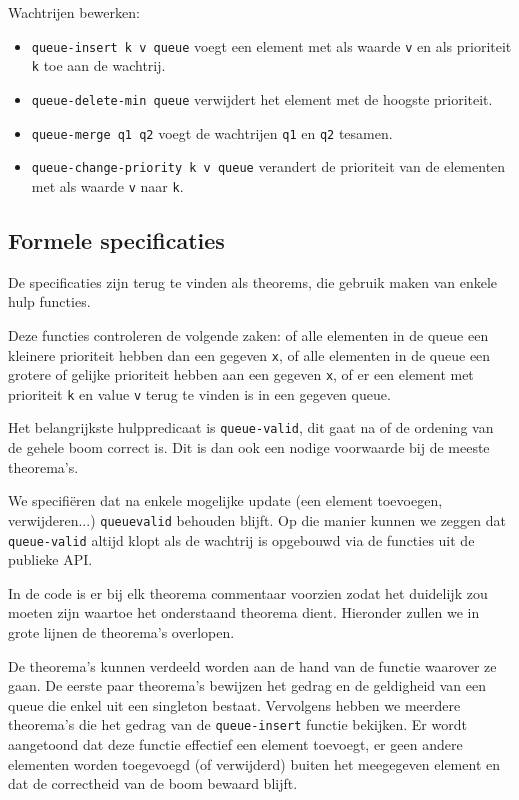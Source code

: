 \documentclass[a4paper,10pt]{article}
\begin{document}
Wachtrijen bewerken:

\begin{itemize}
    \item \texttt{queue-insert k v queue} voegt een element met als waarde
    \texttt{v} en als prioriteit \texttt{k} toe aan de wachtrij.
    \item \texttt{queue-delete-min queue} verwijdert het element met de hoogste
    prioriteit.
    \item \texttt{queue-merge q1 q2} voegt de wachtrijen \texttt{q1} en
    \texttt{q2} tesamen.
    \item \texttt{queue-change-priority k v queue} verandert de prioriteit van
    de elementen met als waarde \texttt{v} naar \texttt{k}.
\end{itemize}

\subsection{Formele specificaties}

De specificaties zijn terug te vinden als theorems, die gebruik maken van enkele
hulp functies.

Deze functies controleren de volgende zaken: of alle elementen in de queue een
kleinere prioriteit hebben dan een gegeven \texttt{x}, of alle elementen in de
queue een grotere of gelijke prioriteit hebben aan een gegeven \texttt{x}, of er
een element met prioriteit \texttt{k} en value \texttt{v} terug te vinden is in
een gegeven queue.

Het belangrijkste hulppredicaat is \texttt{queue-valid}, dit gaat na of de
ordening van de gehele boom correct is. Dit is dan ook een nodige voorwaarde bij
de meeste theorema's.

We specifi\"eren dat na enkele mogelijke update (een element toevoegen,
verwijderen...) \texttt{queue\-valid} behouden blijft. Op die manier kunnen we
zeggen dat \texttt{queue-valid} altijd klopt als de wachtrij is opgebouwd via de
functies uit de publieke API.

In de code is er bij elk theorema commentaar voorzien zodat het duidelijk
zou moeten zijn waartoe het onderstaand theorema dient. Hieronder zullen we
in grote lijnen de theorema's overlopen.

De theorema's kunnen verdeeld worden aan de hand van de functie waarover
ze gaan. De eerste paar theorema's bewijzen het gedrag en de geldigheid van een
queue die enkel uit een singleton bestaat. Vervolgens hebben we meerdere
theorema's die het gedrag van de \texttt{queue-insert} functie bekijken. Er
wordt aangetoond dat deze functie effectief een element toevoegt, er geen
andere elementen worden toegevoegd (of verwijderd) buiten het meegegeven
element en dat de correctheid van de boom bewaard blijft.
\end{document}
